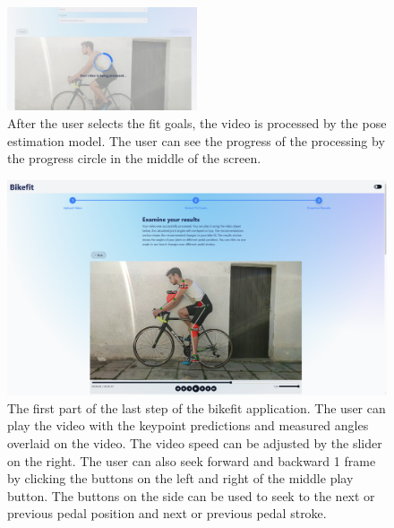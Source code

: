 \begin{figure}
    \centering
    \includegraphics[width=0.5\textwidth]{obrazky-figures/processing-crop.jpeg}
    \caption{After the user selects the fit goals, the video is processed by the pose estimation model. The user can see the progress of the processing by the progress circle in the middle of the screen.}
    \label{fig:processing}
\end{figure}

\begin{figure}[htbp]
    \centering
    \includegraphics[width=\textwidth]{obrazky-figures/step3-top.png}
    \caption{The first part of the last step of the bikefit application. The user can play the video with the keypoint predictions and measured angles overlaid on the video. The video speed can be adjusted by the slider on the right. The user can also seek forward and backward 1 frame by clicking the buttons on the left and right of the middle play button. The buttons on the side can be used to seek to the next or previous pedal position and next or previous pedal stroke.}
    \label{fig:step3-top}
\end{figure}

